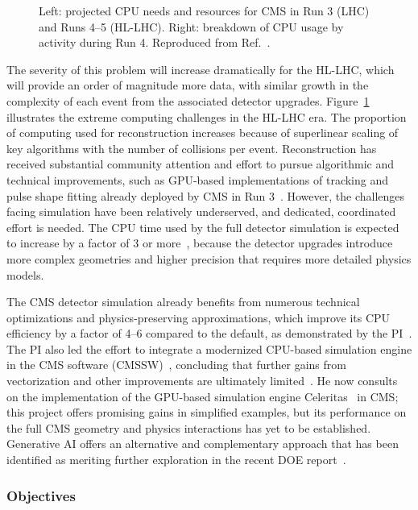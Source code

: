 \begin{figure}[htb!]
\centering
{}
\caption{Left: projected CPU needs and resources for CMS in Run 3 (LHC) and Runs 4--5 (HL-LHC). Right: breakdown of CPU usage by activity during Run 4. Reproduced from Ref.~\cite{CMS-NOTE-2022-008}.
}
\label{fig:cmsoffcomp}
\end{figure}

The severity of this problem will increase dramatically for the HL-LHC, which will provide an order of magnitude more data,
with similar growth in the complexity of each event from the associated detector upgrades.
Figure~\ref{fig:cmsoffcomp} illustrates the extreme computing challenges in the HL-LHC era.
The proportion of computing used for reconstruction increases because of superlinear scaling of key algorithms with the number of collisions per event.
Reconstruction has received substantial community attention and effort to pursue algorithmic and technical improvements,
such as GPU-based implementations of tracking and pulse shape fitting already deployed by CMS in Run 3~\cite{Bocci:2020pmi}.
However, the challenges facing simulation have been relatively underserved, and dedicated, coordinated effort is needed.
The CPU time used by the full detector simulation is expected to increase by a factor of 3 or more~\cite{Pedro:2020kbk},
because the detector upgrades introduce more complex geometries and higher precision that requires more detailed physics models.

The CMS detector simulation already benefits from numerous technical optimizations and physics-preserving approximations,
which improve its CPU efficiency by a factor of 4--6 compared to the default, as demonstrated by the PI~\cite{Pedro:2019mkq}.
The PI also led the effort to integrate a modernized CPU-based simulation engine in the CMS software (CMSSW)~\cite{Pedro:2020kbk},
concluding that further gains from vectorization and other improvements are ultimately limited~\cite{Amadio:2020ink}.
He now consults on the implementation of the GPU-based simulation engine Celeritas~\cite{Tognini:2022nmd} in CMS;
this project offers promising gains in simplified examples, but its performance on the full CMS geometry and physics interactions has yet to be established.
Generative AI offers an alternative and complementary approach that has been identified as meriting further exploration in the recent DOE report~\cite{AI4SES}.

\subsubsection{Objectives}\label{subsec:simobj}


